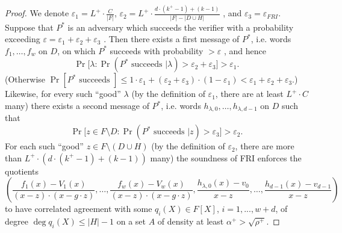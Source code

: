 \documentclass[11pt,article,oneside]{memoir}
\theoremstyle{definition}
\theoremstyle{remark}
\begin{document}
\begin{proof}
We denote $\varepsilon_1=L^+ \cdot \frac{C}{|F|}$, $\varepsilon_2 = L^+ \cdot  \frac{d\cdot (k^+ - 1) + (k - 1)}{|F| - |D\cup H|}$ , and $\varepsilon_3=\varepsilon_{FRI}$. 
Suppose that $P^*$ is an adversary which succeeds the verifier with a probability exceeding $\varepsilon =\varepsilon_1+\varepsilon_2+\varepsilon_3$ .
Then there exists a first message of $P^*$, i.e. words  $f_1, \ldots, f_w$  on $D$, on which $P^*$ succeeds with probability $> \varepsilon$ , and hence
\[
\Pr\big[\lambda : \Pr\left(P^*\text{ succeeds } |\lambda\right) > \varepsilon_2+\varepsilon_3 \big] > \varepsilon_1.
\]
(Otherwise $\Pr[P^*\text{ succeeds }] \leq 1\cdot \varepsilon_1+ (\varepsilon_2 + \varepsilon_3)\cdot (1-\varepsilon_1) < \varepsilon_1+ \varepsilon_2 + \varepsilon_3$.) 
Likewise, for every such “good” $\lambda$ (by the definition of $\varepsilon_1$, there are at least $L^+\cdot C$ many) there exists a second message of $P^*$, i.e. words $h_{\lambda, 0}, \ldots, h_{\lambda, d-1}$ on $D$ such that 
\[
\Pr\big[ z\in F\setminus D :  \Pr(P^*\text{ succeeds }| z) >\varepsilon_3 \big] > \varepsilon_2.
\]
For each such “good” $z\in F\setminus (D\cup H)$ (by the definition of $\varepsilon_2$, there are more than $L^+\cdot \left(d\cdot (k^+ - 1) + (k - 1)\right)$ many) the soundness of FRI enforces the quotients
\[ 
\left( 
\frac{f_1(x)-V_1(x)}{(x-z)\cdot (x-g\cdot z)}, \ldots, \frac{f_w(x)-V_w(x)}{(x-z)\cdot (x-g\cdot z)}, \frac{h_{\lambda,0}(x)- v_0}{x-z}, \ldots , \frac{h_{d - 1}(x) -v_{d-1}}{x-z}
\right)
\]
to have correlated agreement with some $q_i(X)\in F[X]$, $i=1,...,w +d$, of degree $\deg q_i(X) \leq |H|-1$ on a set $A$ of density at least 
$
\alpha^+ %
> \sqrt{\rho^+}.
$ 



\end{proof}
\end{document}
